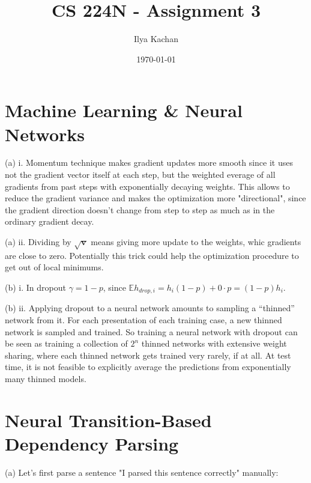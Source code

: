 \documentclass[12pt]{article}
\title{CS 224N - Assignment 3}
\author{Ilya Kachan}
\date{\today}
\begin{document}
\maketitle

\section{Machine Learning \& Neural Networks}

\noindent (a) i. Momentum technique makes gradient updates more smooth since it uses not the gradient vector itself at each step, but the weighted everage of all gradients from past steps with exponentially decaying weights. This allows to reduce the gradient variance and makes the optimization more "directional", since the gradient direction doesn't change from step to step as much as in the ordinary gradient decay.
\smallskip

\noindent (a) ii. Dividing by $\sqrt{\mathbf{v}}$ means giving more update to the weights, whic gradients are close to zero. Potentially this trick could help the optimization procedure to get out of local minimums.
\smallskip

\noindent (b) i. In dropout $\gamma = 1 - p$, since $\mathbb{E} h_{drop, i} = h_i (1-p) + 0 \cdot p = (1-p) h_i$.
\smallskip

\noindent (b) ii. Applying dropout to a neural network amounts to sampling a “thinned” network from
it. For each presentation of each training case, a new thinned network is sampled and
trained. So training a neural network with dropout can be seen as training a collection of $2^n$
thinned networks with extensive weight sharing, where each thinned network gets trained
very rarely, if at all. At test time, it is not feasible to explicitly average the predictions from exponentially many thinned models.

\section{Neural Transition-Based Dependency Parsing}

\noindent (a) Let's first parse a sentence "I parsed this sentence correctly" manually:
\end{document}
